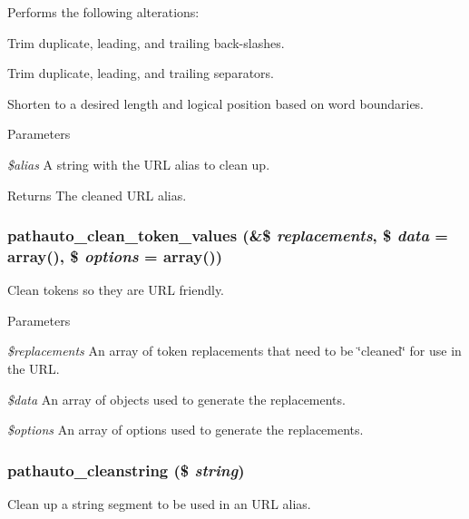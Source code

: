 Performs the following alterations:
\begin{DoxyItemize}
\item Trim duplicate, leading, and trailing back-\/slashes.
\item Trim duplicate, leading, and trailing separators.
\item Shorten to a desired length and logical position based on word boundaries.
\end{DoxyItemize}


\begin{DoxyParams}{Parameters}
\item[{\em \$alias}]A string with the URL alias to clean up. \end{DoxyParams}
\begin{DoxyReturn}{Returns}
The cleaned URL alias. 
\end{DoxyReturn}
\hypertarget{pathauto_8inc_ab835bd3414c289c7a0a2fcbf38d6f13d}{
\subsubsection[{pathauto\_\-clean\_\-token\_\-values}]{\setlength{\rightskip}{0pt plus 5cm}pathauto\_\-clean\_\-token\_\-values (\&\$ {\em replacements}, \/  \$ {\em data} = {\ttfamily array()}, \/  \$ {\em options} = {\ttfamily array()})}}
\label{pathauto_8inc_ab835bd3414c289c7a0a2fcbf38d6f13d}
Clean tokens so they are URL friendly.


\begin{DoxyParams}{Parameters}
\item[{\em \$replacements}]An array of token replacements that need to be \char`\"{}cleaned\char`\"{} for use in the URL. \item[{\em \$data}]An array of objects used to generate the replacements. \item[{\em \$options}]An array of options used to generate the replacements. \end{DoxyParams}
\hypertarget{pathauto_8inc_a0087774598dbc1a71658867d2275a3d1}{
\subsubsection[{pathauto\_\-cleanstring}]{\setlength{\rightskip}{0pt plus 5cm}pathauto\_\-cleanstring (\$ {\em string})}}
\label{pathauto_8inc_a0087774598dbc1a71658867d2275a3d1}
Clean up a string segment to be used in an URL alias.

